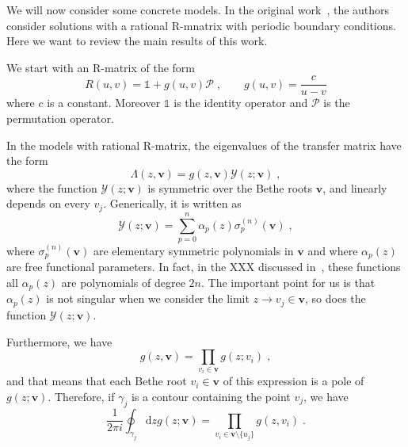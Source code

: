 \documentclass[a4paper,11pt]{amsart}
\begin{document}
We will now consider some concrete models. In the original
work~\cite{Belliard:2019bfz}, the authors consider solutions with a
rational R-mnatrix with periodic boundary conditions. Here we want to
review the main results of this work. 

We start with an R-matrix of the form
\begin{equation}
  R(u,v) = \mathbb{1} + g(u,v) \mathcal{P}\; , \qquad
  g(u,v) = \frac{c}{u - v}
\end{equation}
where \(c\) is a constant. Moreover \(\mathbb{1}\) is the identity operator and
\(\mathcal{P}\) is the permutation operator.

In the models with rational R-matrix, the eigenvalues of the transfer matrix
have the form 
\begin{equation}
  \Lambda(z, \bm{v}) = g(z, \bm{v}) \mathcal{Y}(z; \bm{v})\; ,
\end{equation}
where the function \(\mathcal{Y}(z; \bm{v})\) is symmetric over the
Bethe roots \(\bm{v}\), and linearly depends on every
\(v_j\). Generically, it is written as
\begin{equation}
  \mathcal{Y}(z; \bm{v}) = \sum_{p=0}^n \alpha_p(z) \sigma_p^{(n)}(\bm{v})\; , 
\end{equation}
where \(\sigma_p^{(n)}(\bm{v})\) are elementary symmetric polynomials
in \(\bm{v}\) and where \(\alpha_p(z)\) are free functional
parameters. In fact, in the XXX discussed in~\cite{Belliard:2019bfz},
these functions all \(\alpha_p(z)\) are polynomials of degree \(2n\). 
The important point for us is that \(\alpha_p(z)\) is not
singular when we consider the limit \(z \to v_j \in \bm{v}\),
so does the function \(\mathcal{Y}(z; \bm{v})\). 

Furthermore, we have
\begin{equation}
  g(z, \bm{v}) = \prod_{v_i\in \bm{v}} g(z; v_i)\; , 
\end{equation}
and that means that each Bethe root \( v_i \in \bm{v}\) of this expression
is a pole of \(g(z;\bm{v})\). Therefore, if \(\gamma_j\) is a contour
containing the point \(v_j\), we have 
\begin{equation}
  \frac{1}{2 \pi i}\oint_{\gamma_j} \mathrm{d}z g(z; \bm{v}) = \prod_{v_i \in \bm{v}\setminus \{u_j\}} g(z, v_i)\; .
\end{equation}
\end{document}
